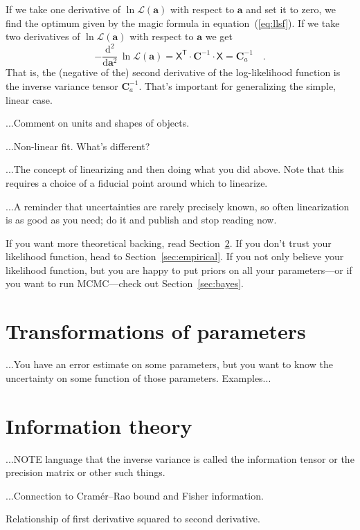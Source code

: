 \documentclass[10pt]{article}
\newcommand{\sectionname}{Section}
\newcommand{\equationname}{equation}
\newcommand{\dd}{\mathrm{d}}
\newcommand{\T}{^{\!\mathsf{T}\!}}
\newcommand{\inv}{^{-1}}
\renewcommand{\vector}[1]{\boldsymbol{#1}}
\newcommand{\tensor}[1]{\mathbf{#1}}
\renewcommand{\matrix}[1]{\mathsf{#1}}
\newcommand{\like}{\mathscr{L}}
\newcommand{\va}{\vector{a}}
\newcommand{\tC}{\tensor{C}}
\newcommand{\mX}{\matrix{X}}
\begin{document}
If we take one derivative of $\ln\like(\va)$ with respect to $\va$ and set it
to zero, we find the optimum given by the magic formula in
\equationname~(\ref{eq:llsf}).
If we take two derivatives of $\ln\like(\va)$ with respect to $\va$ we get
\begin{equation}
  -\frac{\dd^2}{\dd\va^2}\,\ln\like(\va) = \mX\T\cdot\tC\inv\cdot\mX = \tC_a\inv
  \quad.
\end{equation}
That is, the (negative of the) second derivative of the log-likelihood function is
the inverse variance tensor $\tC_a\inv$.
That's important for generalizing the simple, linear case.

...Comment on units and shapes of objects.

...Non-linear fit. What's different?

...The concept of linearizing and then doing what you did above. Note that this
requires a choice of a fiducial point around which to linearize.

...A reminder that uncertainties are rarely precisely known, so often linearization
is as good as you need; do it and publish and stop reading now.

If you want more theoretical backing, read \sectionname~\ref{sec:info}. If you
don't trust your likelihood function, head to \sectionname~\ref{sec:empirical}.
If you not only believe your likelihood function, but you are happy to put priors
on all your parameters---or if you want to run MCMC---check
out \sectionname~\ref{sec:bayes}.

\section{Transformations of parameters}\label{sec:transform}

...You have an error estimate on some parameters, but you want to know the
uncertainty on some function of those parameters. Examples...

\section{Information theory}\label{sec:info}

...NOTE language that the inverse variance is called the information tensor or the precision matrix or other such things.

...Connection to Cram\'er--Rao bound and Fisher information.

Relationship of first derivative squared to second derivative.
\end{document}
